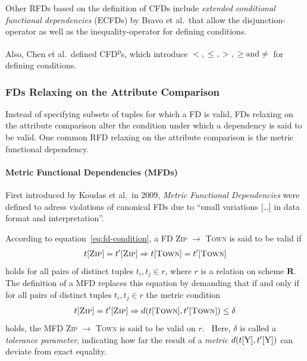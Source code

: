 Other RFDs based on the definition of CFDs include \emph{extended conditional functional dependencies} (ECFDs) by Bravo et al.\ that allow the disjunction-operator as well as the inequality-operator for defining conditions.~\cite{BRA08}

Also, Chen et al.\ defined CFD\textsuperscript{p}s, which introduce \( <, \leq, >, \geq \text{and} \neq \) for defining conditions.~\cite{CHE09}

\subsubsection{FDs Relaxing on the Attribute Comparison}
Instead of specifying subsets of tuples for which a FD is valid, FDs relaxing on the attribute comparison alter the condition under which a dependency is said to be valid.
One common RFD relaxing on the attribute comparison is the metric functional dependency.

\paragraph{Metric Functional Dependencies (MFDs)}
First introduced by Koudas et al.\ in 2009, \emph{Metric Functional Dependencies} were defined to adress violations of canonical FDs due to ``small variations [\dots] in data format and interpretation''.~\cite[p.~1]{KOU09}

According to equation~\ref{eq:fd-condition}, a FD \textsc{Zip} \( \to\) \textsc{Town} is said to be valid if
\begin{align}
    t[\textsc{Zip}] = t'[\textsc{Zip}] \Rightarrow t[\textsc{Town}] = t'[\textsc{Town}]
\end{align}
holds for all pairs of distinct tuples \( t_i, t_j \in r \), where \( r \) is a relation on scheme \( \boldsymbol{R} \).
The definition of a MFD replaces this equation by demanding that if and only if for all pairs of distinct tuples \( t_i, t_j \in r \) the metric condition
\begin{align}\label{eq:mfd-condition}
    t[\textsc{Zip}] = t'[\textsc{Zip}] \Rightarrow d(t[\textsc{Town}], t'[\textsc{Town}]) \leq \delta
\end{align}
holds, the MFD \textsc{Zip} \( \to\) \textsc{Town} is said to be valid on \( r \).~\cite[p.~2]{KOU09}
Here, \( \delta \) is called a \emph{tolerance parameter}, indicating how far the result of a \emph{metric} \( d(t[\textsc{Y}], t'[\textsc{Y}]) \) can deviate from exact equality.


